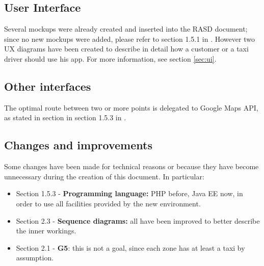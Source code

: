 \newpage
\subsection{User Interface}
Several mockups were already created and inserted into the RASD document; since no new mockups were added, please refer to section 1.5.1 in \cite{rasd}. However two UX diagrams have been created to describe in detail how a customer or a taxi driver should use his app. For more information, see section \ref{sec:ui}. 

\subsection{Other interfaces}
The optimal route between two or more points is delegated to Google Maps API, as stated in section in section 1.5.3 in \cite{rasd}.

\subsection{Changes and improvements}
Some changes have been made for technical reasons or because they have become unnecessary during the creation of this document. In particular:

\begin{itemize}
	\item Section 1.5.3 - \textbf{Programming language:} PHP before, Java EE now, in order to use all facilities provided by the new environment.
	\item Section 2.3 - \textbf{Sequence diagrams:} all have been improved to better describe the inner workings.
	\item Section 2.1 - \textbf{G5}: this is not a goal, since each zone has at least a taxi by assumption.
\end{itemize}